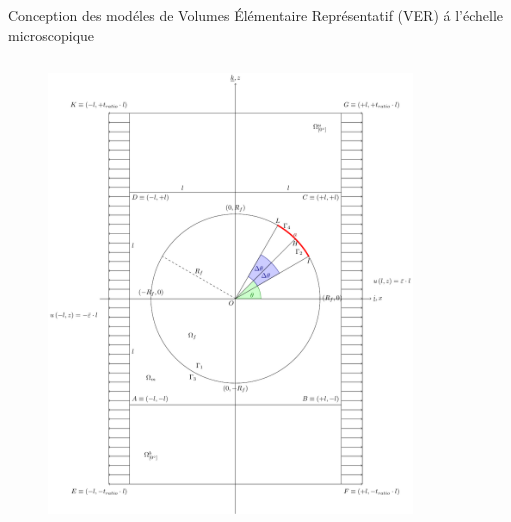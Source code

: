 \documentclass[final]{beamer}
\begin{document}
\begin{frame}
\begin{center}
\begin{minipage}{\textwidth}
\begin{exampleblock}{\rule[-0.6ex]{0pt}{50pt}\centering\LARGE Conception des mod\'eles de Volumes \'El\'ementaire Repr\'esentatif (VER) \'a l'\'echelle microscopique}
\begin{columns}
\begin{column}{0.125\textwidth}
\begin{figure}[!h]
\centering
   \includegraphics[width=\columnwidth]{boundedRVE_cc.pdf}
\end{figure}
\end{column}
\begin{column}{0.15\textwidth}
\begin{figure}[!h]
\centering

\end{figure}
\end{column}
\end{columns}
\end{exampleblock}
\end{minipage}
\end{center}
\end{frame}
\end{document}
